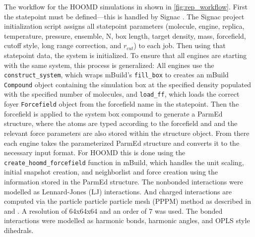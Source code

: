 The workflow for the HOOMD simulations in shown in \autoref{fig:rep_workflow}. First the statepoint must be defined---this is handled by Signac \cite{Adorf2018, signac_zenodo, signac_scipy_2018, signac_scipy_2021}. The Signac project initialization script assigns all statepoint parameters (molecule, engine, replica, temperature, pressure, ensemble, N, box length, target density, mass, forcefield, cutoff style, long range correction, and $r_{cut}$) to each job. Then using that statepoint data, the system is initialized. To ensure that all engines are starting with the same system, this process is generalized: All engines use the \lstinline{construct_system}, which wraps mBuild's \lstinline{fill_box} to creates an mBuild \lstinline{Compound} object containing the simulation box at the specified density populated with the specified number of molecules, and \lstinline{load_ff}, which loads the correct foyer \lstinline{Forcefield} object from the forcefield name in the statepoint. Then the forcefield is applied to the system box compound to generate a ParmEd structure\cite{Shirts2017}, where the atoms are typed according to the forcefield and and the relevant force parameters are also stored within the structure object. From there each engine takes the parameterized ParmEd structure and converts it to the necessary input format. For HOOMD this is done using the \lstinline{create_hoomd_forcefield} function in mBuild, which handles the unit scaling, initial snapshot creation, and neighborlist and force creation using the information stored in the ParmEd structure. 
The nonbonded interactions were modelled as Lennard-Jones (LJ) interactions. 
And charged interactions are computed via the particle particle particle mesh (PPPM) method as described in \citet{Darden1993} and \citet{Lebard2012}. A resolution of 64x64x64 and an order of 7 was used.
The bonded interactions were modelled as harmonic bonds, harmonic angles, and OPLS style dihedrals.
